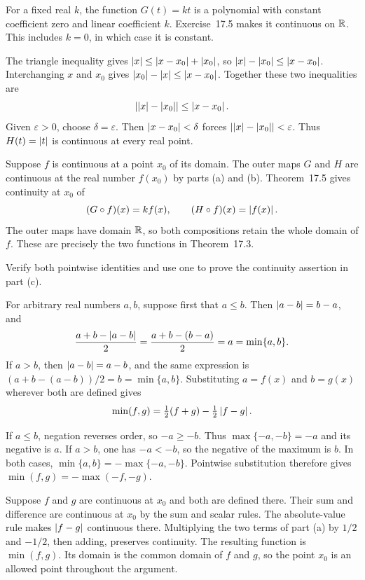 For a fixed real $k$, the function $G(t)=kt$ is a polynomial
with constant coefficient zero and linear coefficient $k$.
Exercise~17.5 makes it continuous on $\mathbb{R}$. This includes
$k=0$, in which case it is constant.

The triangle inequality gives
$\left|x\right|\le\left|x-x_0\right|+\left|x_0\right|$, so
$\left|x\right|-\left|x_0\right|\le\left|x-x_0\right|$.
Interchanging $x$ and $x_0$ gives
$\left|x_0\right|-\left|x\right|\le\left|x-x_0\right|$.
Together these two inequalities are
\[
 \left|\left|x\right|-\left|x_0\right|\right|\le\left|x-x_0\right|.
\]
Given $\varepsilon>0$, choose $\delta=\varepsilon$.
Then $\left|x-x_0\right|<\delta$ forces
$\left|\left|x\right|-\left|x_0\right|\right|<\varepsilon$.
Thus $H(t)=\left|t\right|$ is continuous at every real point.

Suppose $f$ is continuous at a point $x_0$ of its domain.
The outer maps $G$ and $H$ are continuous at the real number
$f(x_0)$ by parts (a) and (b). Theorem~17.5 gives continuity
at $x_0$ of
\[
 (G\circ f)(x)=kf(x),\qquad
 (H\circ f)(x)=\left|f(x)\right|.
\]
The outer maps have domain $\mathbb{R}$, so both compositions retain
the whole domain of $f$. These are precisely the two functions
in Theorem~17.3.

\goal Verify both pointwise identities and use one to prove
the continuity assertion in part (c).

For arbitrary real numbers $a,b$, suppose first that $a\le b$.
Then $\left|a-b\right|=b-a$, and
\[
 \frac{a+b-\left|a-b\right|}2
 =\frac{a+b-(b-a)}2=a=\min\{a,b\}.
\]
If $a>b$, then $\left|a-b\right|=a-b$, and the same expression is
$(a+b-(a-b))/2=b=\min\{a,b\}$.
Substituting $a=f(x)$ and $b=g(x)$ wherever both are defined gives
\[
 \min(f,g)=\tfrac12(f+g)-\tfrac12\left|f-g\right|.
\]

If $a\le b$, negation reverses order, so $-a\ge-b$.
Thus $\max\{-a,-b\}=-a$ and its negative is $a$.
If $a>b$, one has $-a<-b$, so the negative of the maximum
is $b$. In both cases,
$\min\{a,b\}=-\max\{-a,-b\}$.
Pointwise substitution therefore gives
$\min(f,g)=-\max(-f,-g)$.

Suppose $f$ and $g$ are continuous at $x_0$ and both are
defined there. Their sum and difference are continuous at
$x_0$ by the sum and scalar rules. The absolute-value rule
makes $\left|f-g\right|$ continuous there. Multiplying the two terms
of part (a) by $1/2$ and $-1/2$, then adding, preserves
continuity. The resulting function is $\min(f,g)$.
Its domain is the common domain of $f$ and $g$, so the point
$x_0$ is an allowed point throughout the argument.

